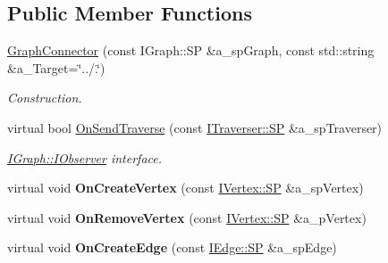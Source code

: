 \subsection*{Public Member Functions}
\begin{DoxyCompactItemize}
\item 
\mbox{\label{class_graph_connector_a370455b7322aa1accaeb06b98d7a3a3d}} 
\hyperlink{class_graph_connector_a370455b7322aa1accaeb06b98d7a3a3d}{Graph\+Connector} (const I\+Graph\+::\+SP \&a\+\_\+sp\+Graph, const std\+::string \&a\+\_\+\+Target=\char`\"{}../.\char`\"{})
\begin{DoxyCompactList}\small\item\em Construction. \end{DoxyCompactList}\item 
\mbox{\label{class_graph_connector_a231b1d4b04afc030628e23ebbe89e2b5}} 
virtual bool \hyperlink{class_graph_connector_a231b1d4b04afc030628e23ebbe89e2b5}{On\+Send\+Traverse} (const \hyperlink{class_i_graph_1_1_i_traverser_a5a5ccc81423d6024742d1898a310d812}{I\+Traverser\+::\+SP} \&a\+\_\+sp\+Traverser)
\begin{DoxyCompactList}\small\item\em \hyperlink{class_i_graph_1_1_i_observer}{I\+Graph\+::\+I\+Observer} interface. \end{DoxyCompactList}\item 
\mbox{\label{class_graph_connector_a5ca194306dfd7b6ded8a516ebe7b46f0}} 
virtual void {\bfseries On\+Create\+Vertex} (const \hyperlink{class_i_graph_1_1_i_vertex_af72b9df91f110bc7824c608c10cc819c}{I\+Vertex\+::\+SP} \&a\+\_\+sp\+Vertex)
\item 
\mbox{\label{class_graph_connector_affb407aff93ba87b5ad1e50a2418028a}} 
virtual void {\bfseries On\+Remove\+Vertex} (const \hyperlink{class_i_graph_1_1_i_vertex_af72b9df91f110bc7824c608c10cc819c}{I\+Vertex\+::\+SP} \&a\+\_\+p\+Vertex)
\item 
\mbox{\label{class_graph_connector_a051d4ce9e6b7fc502d645e1a13f15637}} 
virtual void {\bfseries On\+Create\+Edge} (const \hyperlink{class_i_graph_1_1_i_edge_adfae3ec3e377543685a06b9c5d5a776a}{I\+Edge\+::\+SP} \&a\+\_\+sp\+Edge)
\item 

\end{DoxyCompactItemize}
